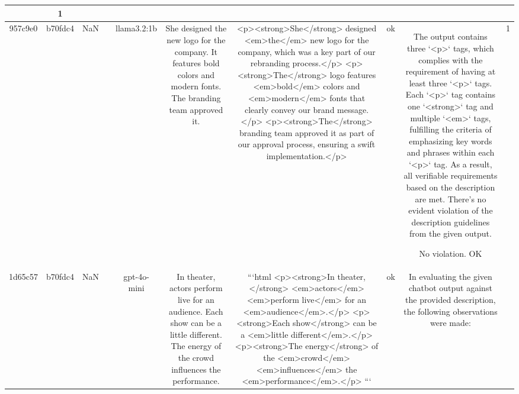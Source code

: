 \begin{table}[h!]
\begin{tabular}{|c|c|c|c|c|c|c|c|c|c|}
{{1. **Insufficient <p> tags wrapping entire sentences**: The description requires that each sentence be wrapped with a <p> tag. In the provided output, each keyword or phrase is individually wrapped in separate <p> tags, rather than each complete sentence having its own <p> tag. For example, "She designed the new logo for the company." should be enclosed within one <p> tag, but is split across multiple <p> tags.

2. **Use of <strong> and <em> tags**: While the description requires that each <p> tag should contain one <strong> tag and multiple <em> tags, this rule can only be verified in context with input, so it is not accounted for in the decision.

Due to the incorrect division of sentences across multiple <p> tags, the output does not meet the requirements as per the description. 

ERR & 1\\
\hline
957c9e0 & b70fdc4 & NaN &  & llama3.2:1b & She designed the new logo for the company. It features bold colors and modern fonts. The branding team approved it. & <p><strong>She</strong> designed <em>the</em> new logo for the company, which was a key part of our rebranding process.</p>
<p><strong>The</strong> logo features <em>bold</em> colors and <em>modern</em> fonts that clearly convey our brand message.</p>
<p><strong>The</strong> branding team approved it as part of our approval process, ensuring a swift implementation.</p> & ok & The output contains three `<p>` tags, which complies with the requirement of having at least three `<p>` tags. Each `<p>` tag contains one `<strong>` tag and multiple `<em>` tags, fulfilling the criteria of emphasizing key words and phrases within each `<p>` tag. As a result, all verifiable requirements based on the description are met. There's no evident violation of the description guidelines from the given output.

No violation.
OK & 1\\
\hline
1d65c57 & b70fdc4 & NaN &  & gpt-4o-mini & In theater, actors perform live for an audience. Each show can be a little different. The energy of the crowd influences the performance. & ```html
<p><strong>In theater,</strong> <em>actors</em> <em>perform live</em> for an <em>audience</em>.</p>
<p><strong>Each show</strong> can be a <em>little different</em>.</p>
<p><strong>The energy</strong> of the <em>crowd</em> <em>influences</em> the <em>performance</em>.</p>
``` & ok & In evaluating the given chatbot output against the provided description, the following observations were made:

}}
\end{tabular}
\end{table}
